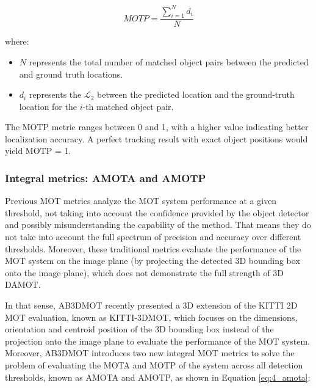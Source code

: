 \begin{equation}
	MOTP = \frac{{\sum_{{i=1}}^{{N}} d_i}}{{N}}
\end{equation}

where:

\begin{itemize}
	
	\item \textbf{\(N\)} represents the total number of matched object pairs between the predicted and ground truth locations.
	
	\item \textbf{\(d_i\)} represents the $\mathcal{L}_2$ between the predicted location and the ground-truth location for the \(i\)-th matched object pair.
	
\end{itemize}

The \ac{MOTP} metric ranges between 0 and 1, with a higher value indicating better localization accuracy. A perfect tracking result with exact object positions would yield \ac{MOTP} = 1.

\subsubsection{Integral metrics: AMOTA and AMOTP}
\label{subsubsec:4_integral_metrics}

Previous \ac{MOT} metrics analyze the \ac{MOT} system performance at a given threshold, not taking into account the confidence provided by the object detector and possibly misunderstanding the capability of the method. That means they do not take into account the full spectrum of precision and accuracy over different thresholds. Moreover, these traditional metrics evaluate the performance of the \ac{MOT} system on the image plane (by projecting the detected 3D bounding box onto the image plane), which does not demonstrate the full strength of 3D \ac{DAMOT}. 

In that sense, AB3DMOT \cite{weng2019baseline} recently presented a 3D extension of the KITTI 2D MOT evaluation, known as KITTI-3DMOT, which focuses on the dimensions, orientation and centroid position of the 3D bounding box instead of the projection onto the image plane to evaluate the performance of the MOT system. Moreover, AB3DMOT introduces two new integral \ac{MOT} metrics to solve the problem of evaluating the \ac{MOTA} and \ac{MOTP} of the system across all detection thresholds, known as \ac{AMOTA} and \ac{AMOTP}, as shown in Equation \ref{eq:4_amota}:

